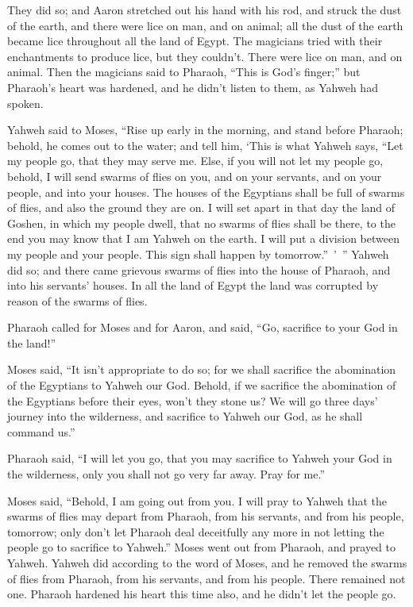 {They did so; and Aaron stretched out his hand with his rod, and struck the dust of the earth, and there were lice on man, and on animal; all the dust of the earth became lice throughout all the land of Egypt.
The magicians tried with their enchantments to produce lice, but they couldn’t. There were lice on man, and on animal.
Then the magicians said to Pharaoh, “This is God’s finger;” but Pharaoh’s heart was hardened, and he didn’t listen to them, as Yahweh had spoken.
\par }{\PP {}Yahweh said to Moses, “Rise up early in the morning, and stand before Pharaoh; behold, he comes out to the water; and tell him, ‘This is what Yahweh says, “Let my people go, that they may serve me.
Else, if you will not let my people go, behold, I will send swarms of flies on you, and on your servants, and on your people, and into your houses. The houses of the Egyptians shall be full of swarms of flies, and also the ground they are on.
I will set apart in that day the land of Goshen, in which my people dwell, that no swarms of flies shall be there, to the end you may know that I am Yahweh on the earth.
I will put a division between my people and your people. This sign shall happen by tomorrow.” ’ ”
Yahweh did so; and there came grievous swarms of flies into the house of Pharaoh, and into his servants’ houses. In all the land of Egypt the land was corrupted by reason of the swarms of flies.
\par }{\PP {}Pharaoh called for Moses and for Aaron, and said, “Go, sacrifice to your God in the land!”
\par }{\PP {}Moses said, “It isn’t appropriate to do so; for we shall sacrifice the abomination of the Egyptians to Yahweh our God. Behold, if we sacrifice the abomination of the Egyptians before their eyes, won’t they stone us?
We will go three days’ journey into the wilderness, and sacrifice to Yahweh our God, as he shall command us.”
\par }{\PP {}Pharaoh said, “I will let you go, that you may sacrifice to Yahweh your God in the wilderness, only you shall not go very far away. Pray for me.”
\par }{\PP {}Moses said, “Behold, I am going out from you. I will pray to Yahweh that the swarms of flies may depart from Pharaoh, from his servants, and from his people, tomorrow; only don’t let Pharaoh deal deceitfully any more in not letting the people go to sacrifice to Yahweh.”
Moses went out from Pharaoh, and prayed to Yahweh.
Yahweh did according to the word of Moses, and he removed the swarms of flies from Pharaoh, from his servants, and from his people. There remained not one.
Pharaoh hardened his heart this time also, and he didn’t let the people go.

}
